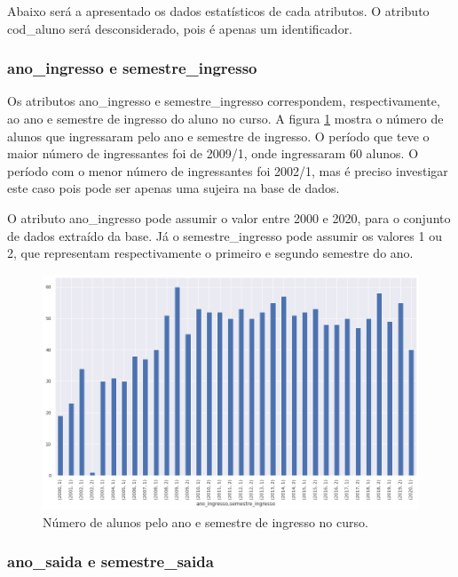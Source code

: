 \documentclass[diss,capa]{texufpel}
\begin{document}
Abaixo será a apresentado os dados estatísticos de cada atributos. O atributo cod\_aluno será desconsiderado, pois é apenas um identificador.

\subsubsection{ano\_ingresso e semestre\_ingresso}
\label{subsubsec:ano-semestre-ingresso}

Os atributos ano\_ingresso e semestre\_ingresso correspondem, respectivamente, ao ano e semestre de ingresso do aluno no curso. A figura \ref{fig:nr-alunos-pelo-ano-semestre-ingresso} mostra o número de alunos que ingressaram pelo ano e semestre de ingresso. O período que teve o maior número de ingressantes foi de 2009/1, onde ingressaram 60 alunos. O período com o menor número de ingressantes foi 2002/1, mas é preciso investigar este caso pois pode ser apenas uma sujeira na base de dados.

O atributo ano\_ingresso pode assumir o valor entre 2000 e 2020, para o conjunto de dados extraído da base. Já o semestre\_ingresso pode assumir os valores 1 ou 2, que representam respectivamente o primeiro e segundo semestre do ano.

\begin{figure}[htbp]
\centering \includegraphics[scale=.41]{imagens/nr-alunos-pelo-ano-semestre-ingresso.png}
\caption{Número de alunos pelo ano e semestre de ingresso no curso.}
\label{fig:nr-alunos-pelo-ano-semestre-ingresso}
\end{figure}

\subsubsection{ano\_saida e semestre\_saida}
\label{subsubsec:ano-semestre-saida}
\end{document}
